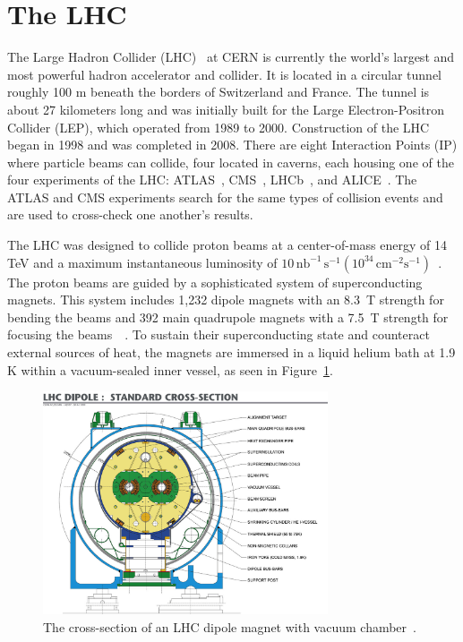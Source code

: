 \label{ch:Experimental_Apparatus}

\section{The LHC}
\label{the_lhc}

The Large Hadron Collider (LHC)~\cite{Brüning:782076} at CERN is currently the world's largest and most powerful hadron accelerator and collider.
It is located in a circular tunnel roughly 100 m beneath the borders of Switzerland and France. The tunnel is about 27 kilometers long and was initially built for the Large Electron-Positron Collider (LEP), which operated from 1989 to 2000. Construction of the LHC began in 1998 and was completed in 2008. There are eight Interaction Points (IP) where particle beams can collide, four located in caverns, each housing one of the four experiments of the LHC: ATLAS~\cite{TheATLASCollaboration_2008}, CMS~\cite{TheCMSCollaboration_2008}, LHCb~\cite{TheLHCbCollaboration_2008}, and ALICE~\cite{TheALICECollaboration_2008}.
The ATLAS and CMS experiments search for the same types of collision events and are used to cross-check one another’s results.

The LHC was designed to collide proton beams at a center-of-mass energy of 14 TeV and a maximum instantaneous luminosity of 
$10 \, \mathrm{nb}^{-1} \, \mathrm{s}^{-1} (10^{34} \, \mathrm{cm}^{-2}\mathrm{s}^{-1})$~\cite{LyndonEvans_2008}.
The proton beams are guided by a sophisticated system of superconducting magnets. This system includes 1,232 dipole magnets with an \SI{8.3}{\tesla} strength for bending the beams and 392 main quadrupole magnets with a \SI{7.5}{\tesla} strength for focusing the beams~\cite{1288863}~\cite{1324760}.
To sustain their superconducting state and counteract external sources of heat, the magnets are immersed in a liquid helium bath at 1.9 K within a vacuum-sealed inner vessel, as seen in Figure~\ref{fig:lhc_dipole}.

\begin{figure}[ht]
    \centering
    \includegraphics[width=0.75\textwidth]{figures/LHC/LHC_dipole.jpg}
    \caption[]{The cross-section of an LHC dipole magnet with vacuum chamber~\cite{Team:40524}.}
    \label{fig:lhc_dipole}
\end{figure}

